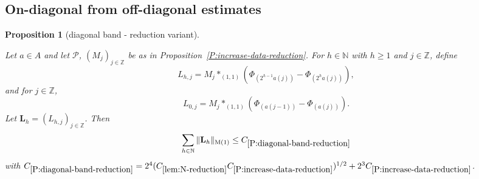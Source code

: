 \documentclass[12pt,reqno]{amsart}
\theoremstyle{plain}
\newtheorem{proposition}[theorem]{Proposition}
\numberwithin{equation}{section}
\theoremstyle{remark}
\newcommand{\uses}[1]{}
\newcommand{\usesdefs}[1]{}
\newcommand{\leanok}{}
\newcommand{\lean}[1]{}
\newcommand{\Z}{{\mathbb Z}}
\newcommand{\N}{{\mathbb N}}
\begin{document}
\subsection{On-diagonal from off-diagonal estimates}\label{sec:on-diag}
\begin{proposition}[diagonal band - reduction variant]
\label{P:diagonal-band-reduction}\uses{P:increase-data-reduction,convolution vector,Cauchy-Schwarz at k,lem:N-reduction,Cauchy-Schwarz at n-1}\usesdefs{auto:Wiener-space-definition,auto:convolution-along-vector-definition,normalized function tuples,auto:prism-form-definition,multiplicatively spaced monotone sequences,standard bump,kernel sequences,square root Gaussian difference}
\lean{Auto.diagonalBandReduction}
\leanok
Let $a\in A$ and let $\mathcal P$, $(M_j)_{j\in \Z}$ be as in Proposition~\ref{P:increase-data-reduction}. For $h\in\N$ with $h\ge1$ and $j\in\Z$, define
\begin{equation}\label{auto:diagonal-band-positive-scale}
L_{h,j}= M_j \ast_{(1,1)} (\Phi_{(2^{h-1}a(j))}-\Phi_{(2^{h}a(j))}),
\end{equation}
and for $j\in \Z$,
\begin{equation}\label{auto:diagonal-band-zero-scale}
L_{0,j}=M_j \ast_{(1,1)} (\Phi_{(a(j-1))}-\Phi_{(a(j))}).
\end{equation}
Let $\mathbf{L}_h=(L_{h,j})_{j\in \Z}$. Then
\begin{equation}\label{auto:diagonal-band-sum-bound}
\sum_{h\in \N} \|\mathbf{L}_h\|_{\rm M(1)} \leq C_{\ref{P:diagonal-band-reduction}}
\end{equation}
with  $C_{\ref{P:diagonal-band-reduction}} = 2^4(
    C_{\ref{lem:N-reduction}}
    C_{\ref{P:increase-data-reduction}}
  )^{1/2} + 2^3 C_{\ref{P:increase-data-reduction}}$.
\end{proposition}
\end{document}
